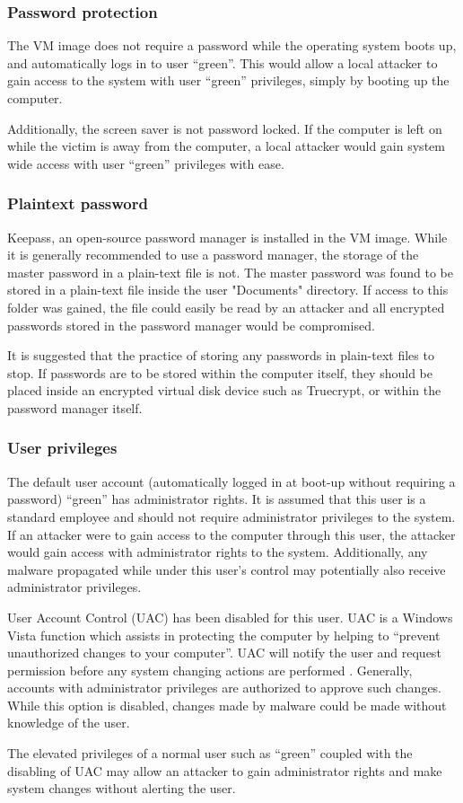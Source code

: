 \subsubsection{Password protection}

The VM image does not require a password while the operating system boots up, and automatically logs in to user ``green''. This would allow a local attacker to gain access to the system with user ``green'' privileges, simply by booting up the computer.

Additionally, the screen saver is not password locked. If the computer is left on while the victim is away from the computer, a local attacker would gain system wide access with user ``green'' privileges with ease.

\subsubsection{Plaintext password}

Keepass, an open-source password manager is installed in the VM image. While it is generally recommended to use a password manager, the storage of the master password in a plain-text file is not. The master password was found to be stored in a plain-text file inside the user "Documents" directory. If access to this folder was gained, the file could easily be read by an attacker and all encrypted passwords stored in the password manager would be compromised.

It is suggested that the practice of storing any passwords in plain-text files to stop. If passwords are to be stored within the computer itself, they should be placed inside an encrypted virtual disk device such as Truecrypt, or within the password manager itself.

\subsubsection{User privileges}

The default user account (automatically logged in at boot-up without requiring a password) ``green'' has administrator rights. It is assumed that this user is a standard employee and should not require administrator privileges to the system. If an attacker were to gain access to the computer through this user, the attacker would gain access with administrator rights to the system. Additionally, any malware propagated while under this user's control may potentially also receive administrator privileges.

User Account Control (UAC) has been disabled for this user. UAC is a Windows Vista function which assists in protecting the computer by helping to ``prevent unauthorized changes to your computer''. UAC will notify the user and request permission before any system changing actions are performed \citep{MicrosoftUAC}. Generally, accounts with administrator privileges are authorized to approve such changes. While this option is disabled, changes made by malware could be made without knowledge of the user.

The elevated privileges of a normal user such as ``green'' coupled with the disabling of UAC may allow an attacker to gain administrator rights and make system changes without alerting the user.